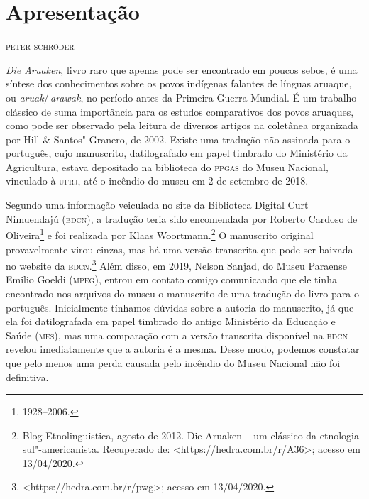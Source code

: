 \newcommand{\subtitulo}[1]{\NoCaseChange{\textnormal{\break\Large\itshape#1}}}
\chapter*{Apresentação\smallskip\subtitulo{Um clássico da etnologia\\ sul-americanista}}


\begin{flushright}
\textsc{peter schröder}\medskip
\end{flushright}

\textit{Die Aruaken}, livro raro que apenas pode ser encontrado em poucos
sebos, é uma síntese dos conhecimentos sobre os povos indígenas falantes
de línguas aruaque, ou \textit{aruak}/\,\textit{arawak}, no período antes da Primeira Guerra Mundial. É um trabalho clássico de suma importância para os
estudos comparativos dos povos aruaques, como pode ser observado pela
leitura de diversos artigos na coletânea organizada por Hill \&
Santos"-Granero, de 2002. Existe uma tradução não assinada para o
português, cujo manuscrito, datilografado em papel timbrado do
Ministério da Agricultura, estava depositado na biblioteca do \textsc{ppgas} do
Museu Nacional, vinculado à \textsc{ufrj}, até o incêndio do museu em 2 de setembro de 2018.

Segundo uma informação veiculada no site da Biblioteca Digital
Curt Nimuendajú (\textsc{bdcn}), a tradução teria sido encomendada por Roberto
Cardoso de Oliveira\footnote{1928--2006.} e foi realizada por Klaas Woortmann.\footnote{Blog Etnolinguistica, agosto de 2012. Die Aruaken --
  um clássico da etnologia sul"-americanista. Recuperado de:
  \textless{}https://hedra.com.br/r/A36\textgreater{};
  acesso em 13/04/2020.} O manuscrito original provavelmente virou
cinzas, mas há uma versão transcrita que pode ser baixada no website da
\textsc{bdcn}.\footnote{\textless{}https://hedra.com.br/r/pwg\textgreater{};
  acesso em 13/04/2020.} Além disso, em 2019, Nelson Sanjad, do Museu
Paraense Emilio Goeldi (\textsc{mpeg}), entrou em contato comigo comunicando que
ele tinha encontrado nos arquivos do museu o manuscrito de uma tradução
do livro para o português. Inicialmente tínhamos dúvidas sobre a
autoria do manuscrito, já que ela foi datilografada em papel timbrado do
antigo Ministério da Educação e Saúde (\textsc{mes}), mas uma comparação com a
versão transcrita disponível na \textsc{bdcn} revelou imediatamente que a autoria
é a mesma. Desse modo, podemos constatar que pelo menos uma perda
causada pelo incêndio do Museu Nacional não foi definitiva.

